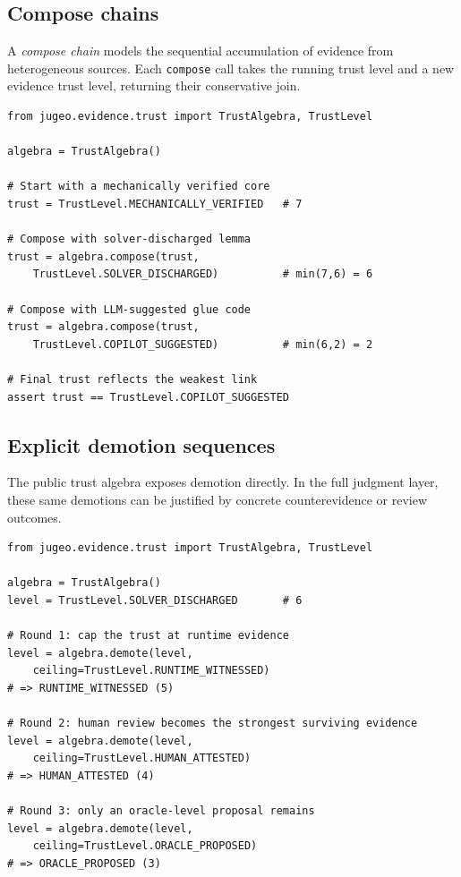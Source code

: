 \documentclass[11pt]{article}
\begin{document}
\subsection{Compose chains}\label{sec:api-compose}

A \emph{compose chain} models the sequential accumulation of
evidence from heterogeneous sources.  Each \texttt{compose}
call takes the running trust level and a new evidence trust
level, returning their conservative join.

\begin{lstlisting}[caption={Compose chain: multi-source verification.},
                   label=lst:compose-chain]
from jugeo.evidence.trust import TrustAlgebra, TrustLevel

algebra = TrustAlgebra()

# Start with a mechanically verified core
trust = TrustLevel.MECHANICALLY_VERIFIED   # 7

# Compose with solver-discharged lemma
trust = algebra.compose(trust,
    TrustLevel.SOLVER_DISCHARGED)          # min(7,6) = 6

# Compose with LLM-suggested glue code
trust = algebra.compose(trust,
    TrustLevel.COPILOT_SUGGESTED)          # min(6,2) = 2

# Final trust reflects the weakest link
assert trust == TrustLevel.COPILOT_SUGGESTED
\end{lstlisting}

\subsection{Explicit demotion sequences}\label{sec:api-challenge}

The public trust algebra exposes demotion directly.  In the full
judgment layer, these same demotions can be justified by concrete
counterevidence or review outcomes.

\begin{lstlisting}[caption={Explicit demotion sequence.},
                   label=lst:challenge-seq]
from jugeo.evidence.trust import TrustAlgebra, TrustLevel

algebra = TrustAlgebra()
level = TrustLevel.SOLVER_DISCHARGED       # 6

# Round 1: cap the trust at runtime evidence
level = algebra.demote(level,
    ceiling=TrustLevel.RUNTIME_WITNESSED)
# => RUNTIME_WITNESSED (5)

# Round 2: human review becomes the strongest surviving evidence
level = algebra.demote(level,
    ceiling=TrustLevel.HUMAN_ATTESTED)
# => HUMAN_ATTESTED (4)

# Round 3: only an oracle-level proposal remains
level = algebra.demote(level,
    ceiling=TrustLevel.ORACLE_PROPOSED)
# => ORACLE_PROPOSED (3)
\end{lstlisting}
\end{document}
